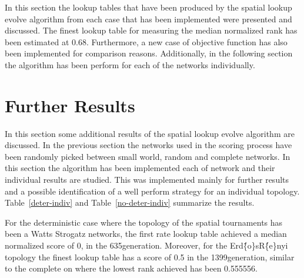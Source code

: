 In this section the lookup tables that have been produced by the spatial lookup
evolve algorithm from each case that has been implemented were presented and discussed.
The finest lookup table for measuring the median normalized rank has been estimated
at 0.68. Furthermore, a new case of objective function has also been implemented
for comparison reasons. Additionally, in the following section the algorithm has
been perform for each of the networks individually.

\section{Further Results}

In this section some additional results of the spatial lookup evolve algorithm
are discussed. In the previous section the networks used in the scoring process
have been randomly picked between small world, random and complete networks.
In this section the algorithm has been implemented each of network and their
individual results are studied. This was implemented mainly for further results and
a possible identification of a well perform strategy for an individual topology.
Table~\ref{deter-indiv} and Table~\ref{no-deter-indiv} summarize the results.

For the deterministic case where the topology of the spatial tournaments has been
a Watts Strogatz networks, the first rate lookup table achieved a median normalized
score of 0, in the 635\nth generation. Moreover, for the Erd\"\{o\}sR\'\{e\}nyi
topology the finest lookup table has a score of 0.5 in the 1399\nth generation, similar
to the complete on where the lowest rank achieved has been 0.555556.

